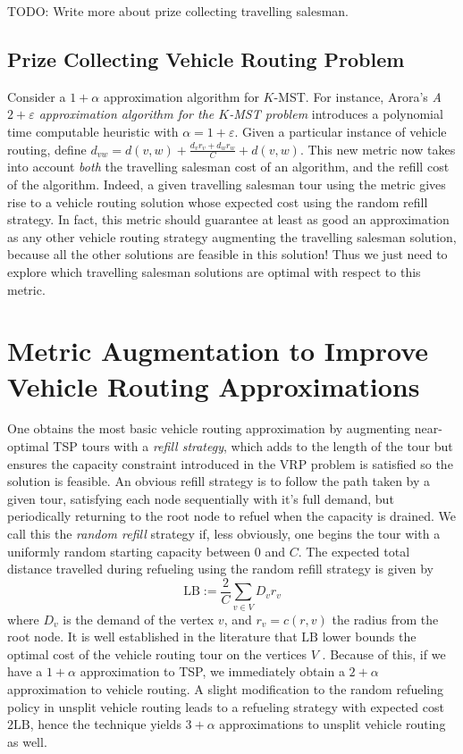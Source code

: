 \documentclass{article}
\theoremstyle{plain}
\begin{document}
TODO: Write more about prize collecting travelling salesman.

\subsection{Prize Collecting Vehicle Routing Problem}

Consider a $1 + \alpha$ approximation algorithm for $K$-MST. For instance, Arora's {\it A $2 + \varepsilon$ approximation algorithm for the $K$-MST problem} introduces a polynomial time computable heuristic with $\alpha = 1 + \varepsilon$. Given a particular instance of vehicle routing, define $d_{vw} = d(v,w) + \frac{d_vr_v + d_wr_w}{C} + d(v,w)$. This new metric now takes into account {\it both} the travelling salesman cost of an algorithm, and the refill cost of the algorithm. Indeed, a given travelling salesman tour using the metric gives rise to a vehicle routing solution whose expected cost using the random refill strategy. In fact, this metric should guarantee at least as good an approximation as any other vehicle routing strategy augmenting the travelling salesman solution, because all the other solutions are feasible in this solution! Thus we just need to explore which travelling salesman solutions are optimal with respect to this metric.

\section{Metric Augmentation to Improve Vehicle Routing Approximations}


One obtains the most basic vehicle routing approximation by augmenting near-optimal TSP tours with a {\it refill strategy}, which adds to the length of the tour but ensures the capacity constraint introduced in the VRP problem is satisfied so the solution is feasible. An obvious refill strategy is to follow the path taken by a given tour, satisfying each node sequentially with it's full demand, but periodically returning to the root node to refuel when the capacity is drained. We call this the {\it random refill} strategy if, less obviously, one begins the tour with a uniformly random starting capacity between $0$ and $C$. The expected total distance travelled during refueling using the random refill strategy is given by
%
\[ \text{LB} := \frac{2}{C} \sum_{v \in V} D_v r_v \]
%
where $D_v$ is the demand of the vertex $v$, and $r_v = c(r,v)$ the radius from the root node. It is well established in the literature that $\text{LB}$ lower bounds the optimal cost of the vehicle routing tour on the vertices $V$ \cite{RandomRefillPaper}. Because of this, if we have a $1 + \alpha$ approximation to TSP, we immediately obtain a $2 + \alpha$ approximation to vehicle routing. A slight modification to the random refueling policy in unsplit vehicle routing leads to a refueling strategy with expected cost $2 \text{LB}$, hence the technique yields $3 + \alpha$ approximations to unsplit vehicle routing as well.
\end{document}
